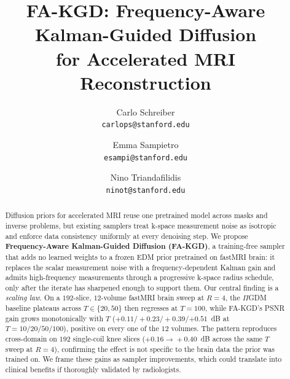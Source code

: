 \documentclass[10pt,twocolumn,letterpaper]{article}
\begin{document}
\title{FA-KGD: Frequency-Aware Kalman-Guided Diffusion\\
for Accelerated MRI Reconstruction}

\author{Carlo Schreiber\\
{\tt\small carlops@stanford.edu}
\and
Emma Sampietro\\
{\tt\small esampi@stanford.edu}
\and
Nino Triandafilidis\\
{\tt\small ninot@stanford.edu}
}

\maketitle
\thispagestyle{empty}

\begin{abstract}
Diffusion priors for accelerated MRI reuse one pretrained model across masks
and inverse problems, but existing samplers treat k-space measurement noise as
isotropic and enforce data consistency uniformly at every denoising step. We
propose \textbf{Frequency-Aware Kalman-Guided Diffusion (FA-KGD)}, a
training-free sampler that adds no learned weights to a frozen EDM
prior pretrained on fastMRI brain: it replaces the scalar measurement noise with a frequency-dependent
Kalman gain and admits high-frequency measurements through a progressive
k-space radius schedule, only after the iterate has sharpened enough to
support them. Our central finding is a \emph{scaling law}. On a $192$-slice,
$12$-volume fastMRI brain sweep at $R{=}4$, the $\Pi$GDM baseline
plateaus across $T\in\{20,50\}$ then regresses at $T{=}100$, while
FA-KGD's PSNR gain grows monotonically with $T$
($+0.11/+0.23/+0.39/\mathbf{+0.51}$~dB at $T{=}10/20/50/100$), positive
on every one of the $12$ volumes. The pattern reproduces cross-domain
on $192$ single-coil knee slices ($+0.16\!\to\!+0.40$~dB across the
same $T$ sweep at $R{=}4$),
confirming the effect is not specific to the brain data the prior was trained on. We frame these gains as
sampler improvements, which could translate into clinical benefits if
thoroughly validated by radiologists.
\end{abstract}

\end{document}
